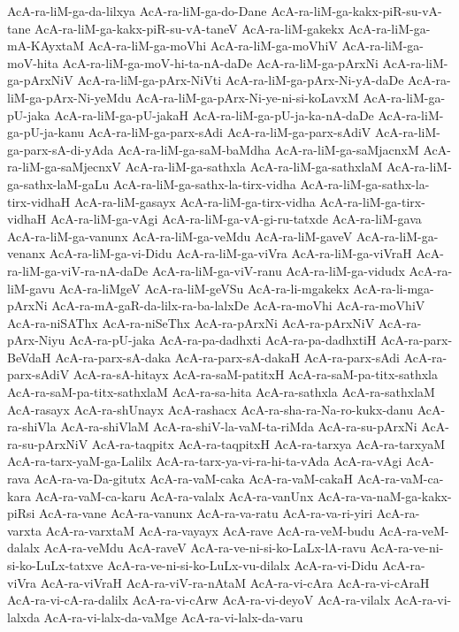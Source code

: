 {AcA-ra-liM-ga-da-lilxya
AcA-ra-liM-ga-do-Dane
AcA-ra-liM-ga-kakx-piR-su-vA-tane
AcA-ra-liM-ga-kakx-piR-su-vA-taneV
AcA-ra-liM-gakekx
AcA-ra-liM-ga-mA-KAyxtaM
AcA-ra-liM-ga-moVhi
AcA-ra-liM-ga-moVhiV
AcA-ra-liM-ga-moV-hita
AcA-ra-liM-ga-moV-hi-ta-nA-daDe
AcA-ra-liM-ga-pArxNi
AcA-ra-liM-ga-pArxNiV
AcA-ra-liM-ga-pArx-NiVti
AcA-ra-liM-ga-pArx-Ni-yA-daDe
AcA-ra-liM-ga-pArx-Ni-yeMdu
AcA-ra-liM-ga-pArx-Ni-ye-ni-si-koLavxM
AcA-ra-liM-ga-pU-jaka
AcA-ra-liM-ga-pU-jakaH
AcA-ra-liM-ga-pU-ja-ka-nA-daDe
AcA-ra-liM-ga-pU-ja-kanu
AcA-ra-liM-ga-parx-sAdi
AcA-ra-liM-ga-parx-sAdiV
AcA-ra-liM-ga-parx-sA-di-yAda
AcA-ra-liM-ga-saM-baMdha
AcA-ra-liM-ga-saMjacnxM
AcA-ra-liM-ga-saMjecnxV
AcA-ra-liM-ga-sathxla
AcA-ra-liM-ga-sathxlaM
AcA-ra-liM-ga-sathx-laM-gaLu
AcA-ra-liM-ga-sathx-la-tirx-vidha
AcA-ra-liM-ga-sathx-la-tirx-vidhaH
AcA-ra-liM-gasayx
AcA-ra-liM-ga-tirx-vidha
AcA-ra-liM-ga-tirx-vidhaH
AcA-ra-liM-ga-vAgi
AcA-ra-liM-ga-vA-gi-ru-tatxde
AcA-ra-liM-gava
AcA-ra-liM-ga-vanunx
AcA-ra-liM-ga-veMdu
AcA-ra-liM-gaveV
AcA-ra-liM-ga-venanx
AcA-ra-liM-ga-vi-Didu
AcA-ra-liM-ga-viVra
AcA-ra-liM-ga-viVraH
AcA-ra-liM-ga-viV-ra-nA-daDe
AcA-ra-liM-ga-viV-ranu
AcA-ra-liM-ga-vidudx
AcA-ra-liM-gavu
AcA-ra-liMgeV
AcA-ra-liM-geVSu
AcA-ra-li-mgakekx
AcA-ra-li-mga-pArxNi
AcA-ra-mA-gaR-da-lilx-ra-ba-lalxDe
AcA-ra-moVhi
AcA-ra-moVhiV
AcA-ra-niSAThx
AcA-ra-niSeThx
AcA-ra-pArxNi
AcA-ra-pArxNiV
AcA-ra-pArx-Niyu
AcA-ra-pU-jaka
AcA-ra-pa-dadhxti
AcA-ra-pa-dadhxtiH
AcA-ra-parx-BeVdaH
AcA-ra-parx-sA-daka
AcA-ra-parx-sA-dakaH
AcA-ra-parx-sAdi
AcA-ra-parx-sAdiV
AcA-ra-sA-hitayx
AcA-ra-saM-patitxH
AcA-ra-saM-pa-titx-sathxla
AcA-ra-saM-pa-titx-sathxlaM
AcA-ra-sa-hita
AcA-ra-sathxla
AcA-ra-sathxlaM
AcA-rasayx
AcA-ra-shUnayx
AcA-rashacx
AcA-ra-sha-ra-Na-ro-kukx-danu
AcA-ra-shiVla
AcA-ra-shiVlaM
AcA-ra-shiV-la-vaM-ta-riMda
AcA-ra-su-pArxNi
AcA-ra-su-pArxNiV
AcA-ra-taqpitx
AcA-ra-taqpitxH
AcA-ra-tarxya
AcA-ra-tarxyaM
AcA-ra-tarx-yaM-ga-Lalilx
AcA-ra-tarx-ya-vi-ra-hi-ta-vAda
AcA-ra-vAgi
AcA-rava
AcA-ra-va-Da-gitutx
AcA-ra-vaM-caka
AcA-ra-vaM-cakaH
AcA-ra-vaM-ca-kara
AcA-ra-vaM-ca-karu
AcA-ra-valalx
AcA-ra-vanUnx
AcA-ra-va-naM-ga-kakx-piRsi
AcA-ra-vane
AcA-ra-vanunx
AcA-ra-va-ratu
AcA-ra-va-ri-yiri
AcA-ra-varxta
AcA-ra-varxtaM
AcA-ra-vayayx
AcA-rave
AcA-ra-veM-budu
AcA-ra-veM-dalalx
AcA-ra-veMdu
AcA-raveV
AcA-ra-ve-ni-si-ko-LaLx-lA-ravu
AcA-ra-ve-ni-si-ko-LuLx-tatxve
AcA-ra-ve-ni-si-ko-LuLx-vu-dilalx
AcA-ra-vi-Didu
AcA-ra-viVra
AcA-ra-viVraH
AcA-ra-viV-ra-nAtaM
AcA-ra-vi-cAra
AcA-ra-vi-cAraH
AcA-ra-vi-cA-ra-dalilx
AcA-ra-vi-cArw
AcA-ra-vi-deyoV
AcA-ra-vilalx
AcA-ra-vi-lalxda
AcA-ra-vi-lalx-da-vaMge
AcA-ra-vi-lalx-da-varu
}

